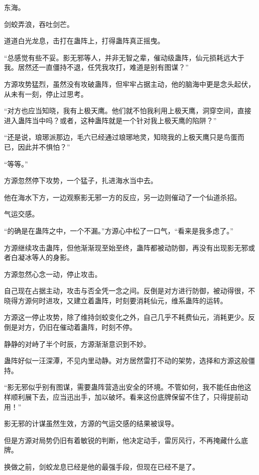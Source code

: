 
\begin{this_body}

东海。

剑蛟弄浪，吞吐剑芒。

道道白光龙息，击打在蛊阵上，打得蛊阵真正摇曳。

“总感觉有些不妥。影无邪等人，并非无智之辈，催动级蛊阵，仙元损耗远大于我。居然还一直僵持不退，任凭我攻打，难道是别有图谋？”

方源攻势猛烈，虽然没有攻破蛊阵，但牢牢占据主动，他的脑海中更是念头起伏，从未有一刻，停止过思考。

“对方也应当知晓，我有上极天鹰。他们就不怕我利用上极天鹰，洞穿空间，直接进入蛊阵当中吗？或者，这种蛊阵就是一个针对我上极天鹰的陷阱？”

“还是说，琅琊派那边，毛六已经通过琅琊地灵，知晓我的上极天鹰只是鸟蛋而已，因此并不惧怕？”

“等等。”

方源忽然停下攻势，一个猛子，扎进海水当中去。

他在海水下方，一边观察影无邪一方的反应，另一边则催动了一个仙道杀招。

气运交感。

“的确是在蛊阵之中，一个不漏。”方源心中松了一口气，“看来是我多虑了。”

方源继续攻击蛊阵，但他渐渐现至始至终，蛊阵都被动防御，再没有出现影无邪或者白凝冰等人的身影。

方源忽然心念一动，停止攻击。

自己现在占据主动，攻击与否全凭一念之间。反倒是对方进行防御，被动得很，不晓得方源何时进攻，又建立着蛊阵，时刻要消耗仙元，维系蛊阵的运转。

方源这一停止攻势，除了维持剑蛟变化之外，自己几乎不耗费仙元，消耗更少。反倒是对方，仍旧在催动着蛊阵，时刻不停。

静静的对峙了半个时辰，方源渐渐意识到不妙。

蛊阵好似一汪深潭，不见内里动静。对方居然雷打不动的架势，选择和方源这般僵持。

“影无邪似乎别有图谋，需要蛊阵营造出安全的环境。不管如何，我不能任由他这样顺利展下去，应当迅出手，加以破坏。看来这份底牌保留不住了，只得提前动用！”

影无邪的计谋虽然生效，方源的气运交感的结果被误导。

但是方源对局势仍旧有着敏锐的判断，他决定动手，雷厉风行，不再掩藏什么底牌。

换做之前，剑蛟龙息已经是他的最强手段，但现在已经不是了。


\end{this_body}
